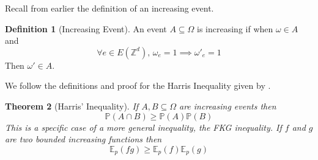 \documentclass[a4paper,11pt]{article}
\newtheorem{theorem}{Theorem}[section]
\theoremstyle{definition}
\newtheorem{definition}[theorem]{Definition}
\newcommand{\ints}{\mathbb{Z}}
\begin{document}
Recall from earlier the definition of an increasing event.
\begin{definition}[Increasing Event]
	An event $ A \subseteq \Omega$ is increasing if when $\omega \in A$ and
	$$\forall e \in E(\ints^d) \text{, } \omega_e = 1 \implies \omega'_e = 1$$
	Then $\omega' \in A$. \\
	\end{definition}
We follow the definitions and proof for the Harris Inequality given by \cite{duminil2018introduction}.
\begin{theorem}[Harris' Inequality] \label{harrisLemma}
If $A, B \subseteq \Omega$ are increasing events then 
$$\mathbb{P}(A \cap B) \geq \mathbb{P}(A)\mathbb{P}(B)$$
This is a specific case of a more general inequality, the FKG inequality.
If $f$ and $g$ are two bounded increasing functions then
$$ \mathbb{E}_p(fg) \geq \mathbb{E}_p(f)\mathbb{E}_p(g)$$
\end{theorem}
\end{document}
